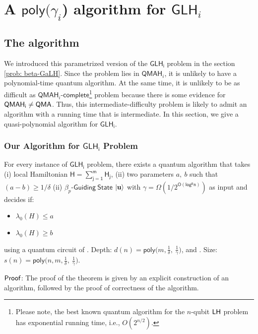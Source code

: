 \documentclass[11pt]{article}
\newcommand{\ms}[1]{\mathsf{#1}}
\begin{document}
\section{A $\ms{poly}(\gamma_i$) algorithm for $\ms{GLH}_i$ }\label{sec: main-algo}
\subsection{The algorithm}\label{sec:uqa}
We introduced this parametrized version of the $\ms{GLH_i}$ problem in the section \ref{prob: beta-GaLH}. Since the problem lies in $\ms{QMAH}_i$, it is unlikely to have a polynomial-time quantum algorithm. At the same time, it is unlikely to be as difficult as $\ms{QMAH}_i$-$\mathsf{complete}$\footnote{Please note, the best known quantum algorithm for the $n$-qubit $\mathsf{LH}$ problem has exponential running time, i.e., $O(2^{n/2})$.} problem because there is some evidence for $\ms{QMAH_i \neq \QMA}$. Thus, this intermediate-difficulty problem is likely to admit an algorithm with a running time that is intermediate. In this section, we give a quasi-polynomial algorithm for $\ms{GLH_i}$.
\subsubsection{Our Algorithm for $\ms{GLH_i}$ Problem}
\begin{theorem}
     For every instance of $\ms{GLH_i}$ problem, there exists a quantum algorithm that takes (i) local Hamiltonian $\mathsf{H=\sum_{j=1}^m H_j}$, (ii) two parameters $a,\ b$ such that $(a-b)\geq  1/\delta$ (ii) $\beta_p$-$\mathsf{Guiding\ State}$ $\ket{\mathbf{u}}$ with $\gamma=\Omega(1/2^{\mathsf{O(log^p n)}})$ as input and decides if:
    \begin{itemize}
        \item $\lambda_0(H) \leq a$
        \item $\lambda_0(H) \geq b$
    \end{itemize}
    using a quantum circuit of . Depth: $d(n)=\mathsf{poly}\Big(m, \frac{1}{\delta},\ \frac{1}{\gamma}  \Big)$, and . Size: $s(n)=\mathsf{poly}\Big(n, m,  \frac{1}{\delta},\ \frac{1}{\gamma}  \Big)$.
    \label{thm: master-theorem}
\end{theorem}
$\mathsf{Proof}$: The proof of the theorem is given by an explicit construction of an algorithm, followed by the proof of correctness of the algorithm.
\end{document}
